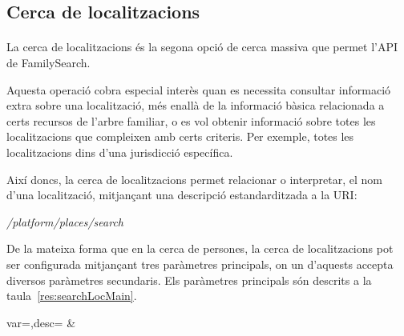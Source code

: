     \subsection{Cerca de localitzacions}

        \paragraph{}
        La cerca de localitzacions és la segona opció de cerca massiva que permet l'API de FamilySearch.

        Aquesta operació cobra especial interès quan es necessita consultar informació extra sobre una localització, més enallà de la informació bàsica relacionada a certs recursos de l'arbre familiar, o es vol obtenir informació sobre totes les localitzacions  que compleixen amb certs criteris. Per exemple, totes les localitzacions dins d'una jurisdicció específica.

        Així doncs, la cerca de localitzacions permet relacionar o interpretar, el nom d'una localització, mitjançant una descripció estandarditzada a la URI:

        \begin{displayquote}
            \emph{/platform/places/search}
        \end{displayquote}

        De la mateixa forma que en la cerca de persones, la cerca de localitzacions pot ser configurada mitjançant tres paràmetres principals, on un d'aquests accepta diversos paràmetres secundaris. Els paràmetres principals són descrits a la taula~\ref{res:searchLocMain}.

        \begin{center}
                 {var=\var,desc=\desc}
                 {\var&\desc}
         \end{center}

